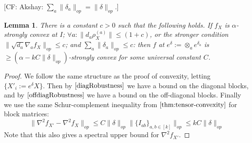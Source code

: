 \documentclass{article}
\newtheorem{lemma}[theorem]{Lemma}
\newcommand{\CF}[1]{{\color{purple}[CF: #1]}}
\begin{document}
\CF{Akshay: $\sum_{a} \|\delta_{a}\|_{op} = \|\delta\|_{op}.$}
\begin{lemma} \label{convexRobustness}
There is a constant $c>0$ such that the following holds. If $f_{X}$ is $\alpha$-strongly convex at $I$; $\forall a: \|d_{a} \rho_{X}^{(a)}\| \leq (1+c)$, or the stronger condition $\|\sqrt{d_{a}} \nabla_{a} f_{X}\|_{op} \leq c$; and $\sum_{a} \|\delta_{a}\|_{op} \leq c$: then $f$ at $e^{\delta} := \otimes_{a} e^{\delta_{a}}$ is $\geq (\alpha - k C \|\delta\|_{op})$-strongly convex for some universal constant $C$. 
\end{lemma}
\begin{proof}
We follow the same structure as the proof of convexity, letting $\{X'_{i} := e^{\delta} X\}$. Then by $\ref{diagRobustness}$ we have a bound on the diagonal blocks, and by $\ref{offdiagRobustness}$ we have a bound on the off-diagonal blocks. Finally we use the same Schur-complement inequality from $\ref{thm:tensor-convexity}$ for block matrices:
\[ \|\nabla^2 f_{X'} - \nabla^{2} f_{X}\|_{op} \leq C \|\delta\|_{op} \|\{I_{ab}\}_{a,b \in [k]}\|_{op} \leq k C \|\delta\|_{op}  \]
Note that this also gives a spectral upper bound for $\nabla^{2} f_{X'}$. 
\end{proof}
\end{document}
